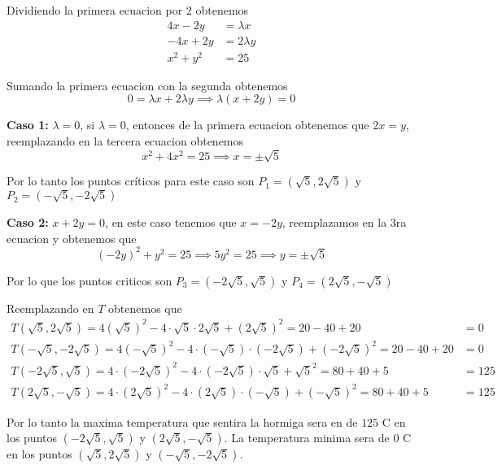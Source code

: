 \documentclass[a4paper,oneside,10.5pt]{article}
\begin{document}
\begin{sol}
    Dividiendo la primera ecuacion por $2$ obtenemos
    \begin{align*}
        4x - 2y &= \lambda x\\
        -4x + 2y &= 2\lambda y\\
        x^2 + y^2 &= 25
    \end{align*}

    Sumando la primera ecuacion con la segunda obtenemos
    \begin{equation*}
        0 = \lambda x + 2\lambda y \implies \lambda(x + 2y) = 0
    \end{equation*}

    \textbf{Caso 1: }$\lambda = 0$, si $\lambda = 0$, entonces de la primera ecuacion obtenemos que $2x = y$, reemplazando en la tercera ecuacion obtenemos
    \begin{equation*}
        x^2 + 4x^2 = 25 \implies x = \pm \sqrt{5}
    \end{equation*}

    Por lo tanto los puntos críticos para este caso son $P_1 = (\sqrt{5}, 2 \sqrt{5})$ y $P_2 = (-\sqrt{5}, -2\sqrt{5})$

    \textbf{Caso 2: } $x + 2y = 0$, en este caso tenemos que $x = -2y$, reemplazamos en la 3ra ecuacion y obtenemos que
    \begin{equation*}
        {(-2y)}^{2} + y^2 = 25 \implies 5y^2 = 25 \implies y = \pm \sqrt{5}
    \end{equation*}

    Por lo que los puntos criticos son $P_3 = (-2\sqrt{5}, \sqrt{5})$ y $P_4 = (2\sqrt{5}, -\sqrt{5})$

    Reemplazando en $T$ obtenemos que
    \begin{align*}
        T(\sqrt5, 2\sqrt5) = 4{(\sqrt5)}^2 - 4 \cdot \sqrt{5} \cdot 2\sqrt5 + {(2\sqrt{5})}^2 = 20 - 40 + 20 &= 0\\
        T(-\sqrt5, -2\sqrt5) = 4{(-\sqrt5)}^2 - 4 \cdot (-\sqrt5) \cdot (-2\sqrt5) + {(-2\sqrt5)}^2 = 20 - 40 + 20 &= 0\\
        T(-2\sqrt5, \sqrt5) = 4\cdot {(-2\sqrt5)}^2 -4\cdot(-2\sqrt5)\cdot\sqrt5 + \sqrt5^2 = 80 + 40 + 5 &= 125\\
        T(2\sqrt5, -\sqrt5) = 4 \cdot {(2\sqrt5)}^2 - 4 \cdot (2\sqrt5) \cdot (-\sqrt5) + {(-\sqrt5)}^2 = 80 + 40 + 5 &= 125
    \end{align*}

    Por lo tanto la maxima temperatura que sentira la hormiga sera en de $125$ C en los puntos $(-2\sqrt5, \sqrt5)$ y $(2\sqrt5, -\sqrt5)$. La temperatura minima sera de $0$ C en los puntos $(\sqrt5, 2\sqrt5)$ y $(-\sqrt5, -2\sqrt5)$.
\end{sol}
\end{document}

